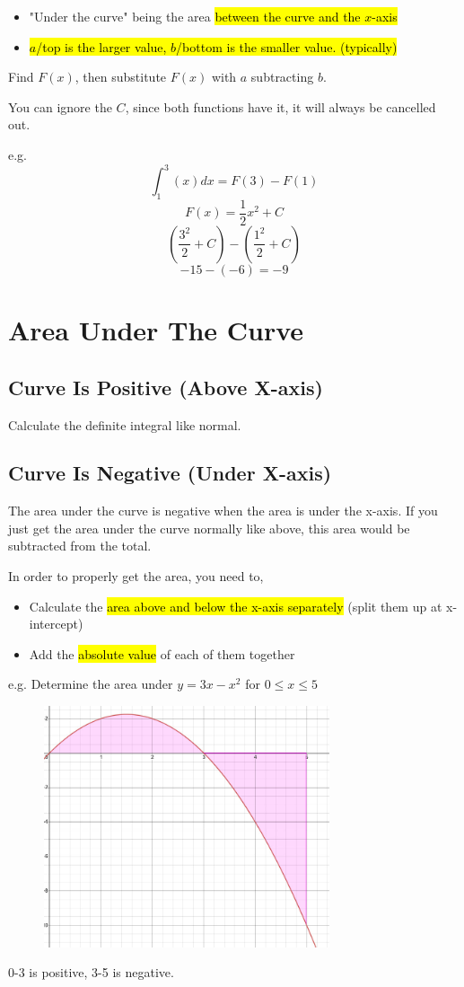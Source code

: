 \documentclass[a4paper,12pt]{article}
\begin{document}
\begin{itemize}
    \item{"Under the curve" being the area \hl{between the curve and the $x$-axis}}
    \item{\hl{$a$/top is the larger value, $b$/bottom is the smaller value. (typically)}}
\end{itemize}

Find $F(x)$, then substitute $F(x)$ with $a$ subtracting $b$. 

You can ignore the $C$, since both functions have it, it will always be cancelled out.

e.g. $$\int^3_1{(x)}dx = F(3) - F(1)$$
$$F(x) = \frac{1}{2}x^2 + C$$
$$(\frac{3^2}{2} + C) - (\frac{1^2}{2} + C)$$
$$-15 - (-6) = -9$$

\section{Area Under The Curve}
\subsection{Curve Is Positive (Above X-axis)}
Calculate the definite integral like normal.

\subsection{Curve Is Negative (Under X-axis)}
The area under the curve is negative when the area is under the x-axis. If you just get the area under the curve normally like above, this area would be subtracted from the total.

In order to properly get the area, you need to,
\begin{itemize}
    \item{Calculate the \hl{area above and below the x-axis separately} (split them up at x-intercept)}
    \item{Add the \hl{absolute value} of each of them together}
\end{itemize}

e.g. Determine the area under $y = 3x - x^2$ for $0 \leq x \leq 5$
\begin{figure}[H]
    \centering
    \includegraphics[width=0.75\textwidth]{negative}
\end{figure}
0-3 is positive, 3-5 is negative.
\end{document}
